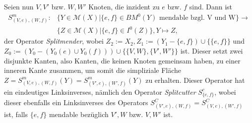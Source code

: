 \documentclass[12pt,titlepage,twoside,cleardoublepage]{article}
\theoremstyle{nummermitklammern}
\numberwithin{equation}{section}
\begin{document}
Seien nun $V,V'$ bzw. $W,W'$ Knoten, die inzident zu $e$ bzw. $f$ sind. Dann ist 
  \begin{align*}
  S^m_{(V,e),(W,f)}:&\{Y \in \mathcal{M}(X)|\{e,f\} \in BM^{0}(Y) \text{ mendable bzgl. V und W} \}  
  \to\\ & \{Z \in \mathcal{M}(X)|\{e,f\} \in I^{0}(Z)\}, 
  Y \mapsto Z, 
   \end{align*}
  der Operator \emph{Splitmender}, wobei $Z_2 := X_2,Z_1 := (Y_1 - \{e,f\}) \cup \{\{e,f\}\}$ und $Z_0:=(Y_0 -(Y_0 (e) \cup Y_0(f))) \cup \{\{V,W\},\{V',W'\}\}$ ist. Dieser setzt zwei disjunkte Kanten, also Kanten, die keinen Knoten gemeinsam haben, zu einer inneren Kante zusammen, um somit die simpliziale Fläche $Z=S^m_{(V,e),(W,f)}(Y)=S^m_{(V',e),(W',f)}(Y)$ zu erhalten. Dieser Operator hat ein eindeutiges Linksinverses, nämlich den Operator \emph{Splitcutter} $S^c_{\{e,f\}}$, wobei dieser ebenfalls ein Linksinverses des Operators  $S^C_{(V',e),(W,f)}=S^C_{(V,e),(W',f)}$ ist, falls $\{e,f\}$ mendable bezüglich $V',W$ bzw. $V,W'$ ist.
\end{document}

